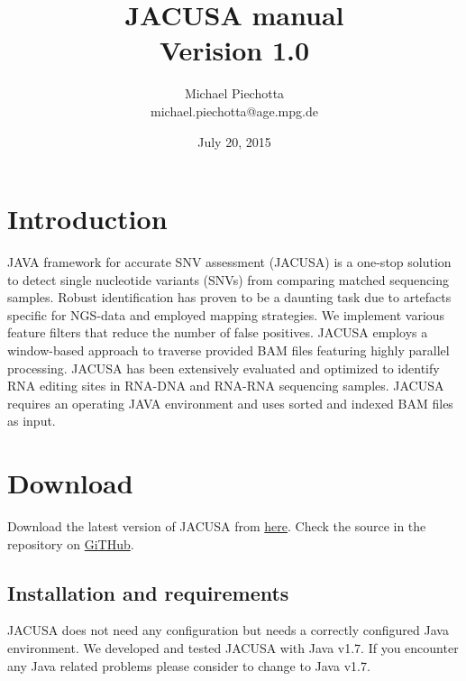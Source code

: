 \documentclass[12pt, a4paper]{article}
\title{JACUSA manual \\ Verision 1.0}
\author{Michael Piechotta \\ michael.piechotta@age.mpg.de}
\date{July 20, 2015}
\begin{document}
\maketitle \tableofcontents
\section{Introduction}
JAVA framework for accurate SNV assessment (JACUSA) is a one-stop solution to detect single
nucleotide variants (SNVs) from comparing matched sequencing samples. Robust identification has
proven to be a daunting task due to artefacts specific for NGS-data and employed mapping
strategies. We implement various feature filters that reduce the number of false positives. JACUSA
employs a window-based approach to traverse provided BAM files featuring highly parallel processing.
JACUSA has been extensively evaluated and optimized to identify RNA editing sites in RNA-DNA and
RNA-RNA sequencing samples. JACUSA requires an operating JAVA environment and uses sorted and
indexed BAM files as input.
\section{Download}
Download the latest version of JACUSA from \href{http://www.age.mpg.de/software/jacusa/latest.tar.gz}{here}.
Check the source in the repository on
\href{https://github.com/dieterich-lab/JACUSA}{GiTHub}.
\subsection{Installation and requirements}
JACUSA does not need any configuration but needs a correctly configured Java environment.
We developed and tested JACUSA with Java v1.7. If you encounter any Java related problems please
consider to change to Java v1.7.
\end{document}
